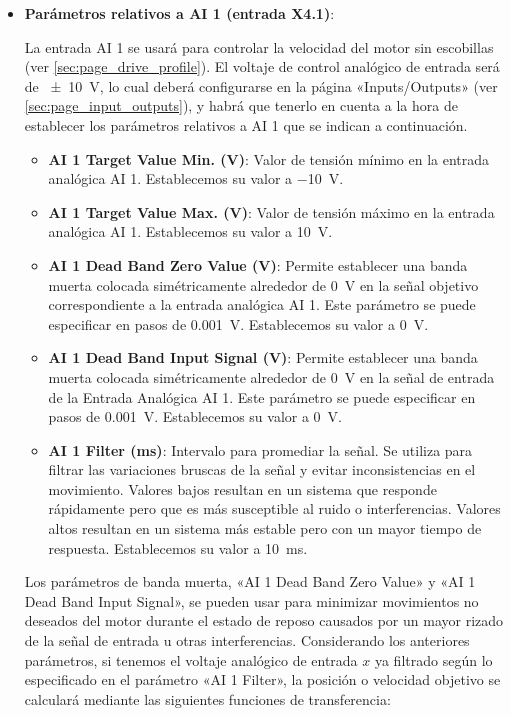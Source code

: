 \documentclass[english,spanish,a4paper,11pt]{article}
\begin{document}
\begin{itemize}
    \item \textbf{Parámetros relativos a AI 1 (entrada X4.1)}:
    
    La entrada AI 1 se usará para controlar la velocidad del motor sin escobillas (ver \cref{sec:page_drive_profile}). El voltaje de control analógico de entrada será de \qty{\pm10}{\V}, lo cual deberá configurarse en la página «Inputs/Outputs» (ver \cref{sec:page_input_outputs}), y habrá que tenerlo en cuenta a la hora de establecer los parámetros relativos a AI 1 que se indican a continuación.
    
    \begin{itemize}
        \item \textbf{AI 1 Target Value Min. (\unit{\V})}: Valor de tensión mínimo en la entrada analógica AI 1. Establecemos su valor a \qty{-10}{\V}.
  
        \item \textbf{AI 1 Target Value Max. (\unit{\V})}: Valor de tensión máximo en la entrada analógica AI 1. Establecemos su valor a \qty{10}{\V}.
  
        \item \textbf{AI 1 Dead Band Zero Value (\unit{\V})}: Permite establecer una banda muerta colocada simétricamente alrededor de \qty{0}{V} en la señal objetivo correspondiente a la entrada analógica AI 1. Este parámetro se puede especificar en pasos de \qty{0.001}{\V}. Establecemos su valor a \qty{0}{\V}.
  
        \item \textbf{AI 1 Dead Band Input Signal (\unit{\V})}: Permite establecer una banda muerta colocada simétricamente alrededor de \qty{0}{V} en la señal de entrada de la Entrada Analógica AI 1. Este parámetro se puede especificar en pasos de \qty{0.001}{\V}. Establecemos su valor a \qty{0}{\V}.
  
        \item \textbf{AI 1 Filter (\unit{\ms})}: Intervalo para promediar la señal. Se utiliza para filtrar las variaciones bruscas de la señal y evitar inconsistencias en el movimiento. Valores bajos resultan en un sistema que responde rápidamente pero que es más susceptible al ruido o interferencias. Valores altos resultan en un sistema más estable pero con un mayor tiempo de respuesta. Establecemos su valor a \qty{10}{\ms}.
    \end{itemize}


    Los parámetros de banda muerta, «AI 1 Dead Band Zero Value» y «AI 1 Dead Band Input Signal», se pueden usar para minimizar movimientos no deseados del motor durante el estado de reposo causados por un mayor rizado de la señal de entrada u otras interferencias. Considerando los anteriores parámetros, si tenemos el voltaje analógico de entrada $x$ ya filtrado según lo especificado en el parámetro «AI 1 Filter», la posición o velocidad objetivo se calculará mediante las siguientes funciones de transferencia:
    

\end{itemize}
\end{document}
